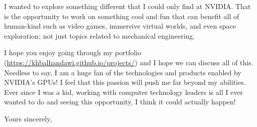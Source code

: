 \documentclass[12pt]{article} %
\begin{document}
\medskip %

I wanted to explore something different that I could only find at NVIDIA. That is the opportunity to work on something cool and fun that can benefit all of human-kind such as video games, immersive virtual worlds, and even space exploration; not just topics related to mechanical engineering. 

\medskip %

I hope you enjoy going through my portfolio (\href{https://khbalhandawi.github.io/projects/}{https://khbalhandawi.github.io/projects/}) and I hope we can discuss all of this. Needless to say, I am a huge fan of the technologies and products enabled by NVIDIA's GPUs! I feel that this passion will push me far beyond my abilities. Ever since I was a kid, working with computer technology leaders is all I ever wanted to do and seeing this opportunity, I think it could actually happen!





\medskip %

Yours sincerely,
\end{document}
